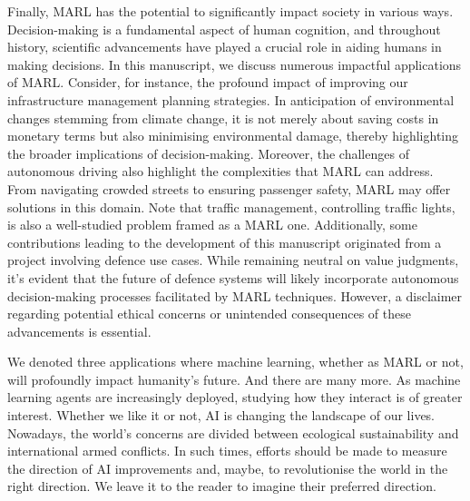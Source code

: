 Finally, MARL has the potential to significantly impact society in various ways.
Decision-making is a fundamental aspect of human cognition, and throughout history, scientific advancements have played a crucial role in aiding humans in making decisions.
In this manuscript, we discuss numerous impactful applications of MARL.
Consider, for instance, the profound impact of improving our infrastructure management planning strategies.
In anticipation of environmental changes stemming from climate change, it is not merely about saving costs in monetary terms but also minimising environmental damage, thereby highlighting the broader implications of decision-making.
Moreover, the challenges of autonomous driving also highlight the complexities that MARL can address.
From navigating crowded streets to ensuring passenger safety, MARL may offer solutions in this domain.
Note that traffic management, controlling traffic lights, is also a well-studied problem framed as a MARL one.
Additionally, some contributions leading to the development of this manuscript originated from a project involving defence use cases.
While remaining neutral on value judgments, it's evident that the future of defence systems will likely incorporate autonomous decision-making processes facilitated by MARL techniques.
However, a disclaimer regarding potential ethical concerns or unintended consequences of these advancements is essential.

We denoted three applications where machine learning, whether as MARL or not, will profoundly impact humanity's future.
And there are many more.
As machine learning agents are increasingly deployed, studying how they interact is of greater interest.
Whether we like it or not, AI is changing the landscape of our lives.
Nowadays, the world's concerns are divided between ecological sustainability and international armed conflicts.
In such times, efforts should be made to measure the direction of AI improvements and, maybe, to revolutionise the world in the right direction.
We leave it to the reader to imagine their preferred direction.